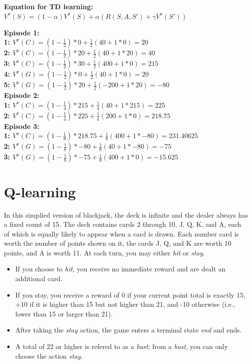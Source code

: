 \documentclass[12pt]{article}
\begin{document}
\noindent \bf{Equation for TD learning:}
$V^\pi(S) = (1-\alpha)V^\pi(S) + \alpha(R(S,A,S') + \gamma V^\pi(S'))$

\noindent \bf{Episode 1:} \\
1: $V^\pi(C) = (1-\frac{1}{2}) * 0 + \frac{1}{2}(40 + 1 * 0) = 20$ \\
2: $V^\pi(C) = (1-\frac{1}{2}) * 20 + \frac{1}{2}(40 + 1 * 20) = 40$ \\
3: $V^\pi(C) = (1-\frac{1}{2}) * 30 + \frac{1}{2}(400 + 1 * 0) = 215$ \\
4: $V^\pi(G) = (1-\frac{1}{2}) * 0 + \frac{1}{2}(40 + 1 * 0) = 20$ \\
5: $V^\pi(G) = (1-\frac{1}{2}) * 20 + \frac{1}{2}(-200 + 1 * 20) = -80$ \\

\noindent \bf{Episode 2:} \\
1: $V^\pi(C) = (1-\frac{1}{4}) * 215 + \frac{1}{4}(40 + 1 * 215) = 225$ \\
2: $V^\pi(C) = (1-\frac{1}{4}) * 225 + \frac{1}{4}(200 + 1 * 0) = 218.75$ \\

\noindent \bf{Episode 3:} \\
1: $V^\pi(C) = (1-\frac{1}{8}) * 218.75 + \frac{1}{8}(400 + 1 * -80) = 231.40625$ \\
2: $V^\pi(G) = (1-\frac{1}{8}) * -80 + \frac{1}{8}(40 + 1 * -80) = -75$ \\
3: $V^\pi(G) = (1-\frac{1}{8}) * -75 + \frac{1}{8}(400 + 1 * 0) = -15.625$


\clearpage


\section{Q-learning}

In this simplied version of blackjack, the deck is infinite and the
dealer always has a fixed count of 15.  The deck contains cards 2
through 10, J, Q, K, and A, each of which is equally likely to appear
when a card is drawn.  Each number card is worth the number of points
shown on it, the cards J, Q, and K are worth 10 points, and A is worth
11.  At each turn, you may either {\it hit} or {\it stay}.

\begin{itemize}

\item If you choose to {\it hit}, you receive no immediate reward and
  are dealt an additional card.  

\item If you stay, you receive a reward of 0 if your current point
  total is exactly 15, +10 if it is higher than 15 but not higher than
  21, and -10 otherwise (i.e., lower than 15 or larger than 21).

\item After taking the {\it stay} action, the game enters a terminal
  state {\it end} and ends.

\item A total of 22 or higher is refered to as a {\it bust}; from a
  {\it bust}, you can only choose the action {\it stay}.

\end{itemize}
\end{document}
